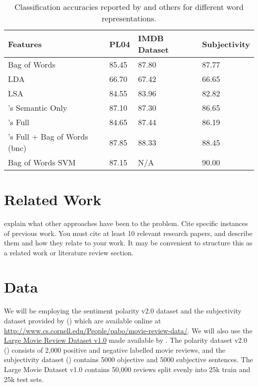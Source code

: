 \documentclass[11pt, oneside]{article}
\begin{document}
\begin{table}[H]
\begin{tabular}{ | l | p{1.5cm} | p{2.5cm} | p{2.5cm} |  }
 \hline
 \textbf{Features} & \textbf{PL04} & \textbf{IMDB Dataset} & \textbf{Subjectivity} \\
 \hline
 Bag of Words   & 85.45 & 87.80 & 87.77 \\
 LDA & 66.70 & 67.42 & 66.65 \\
 LSA & 84.55 & 83.96 & 82.82 \\
 \cite{maas2011learning}'s Semantic Only & 87.10 & 87.30 & 86.65 \\
 \cite{maas2011learning}'s Full & 84.65 & 87.44 & 86.19 \\
 \cite{maas2011learning}'s Full + Bag of Words (bnc) & 87.85 & 88.33 & 88.45 \\
 Bag of Words SVM \cite{pang2004sentimental} & 87.15 & N/A & 90.00 \\
 \hline
\end{tabular}
\caption{Classification accuracies reported by \cite{maas2011learning} and others for different word representations.}
\label{table:1}
\end{table}
\section{Related Work}
explain what other approaches have been to the problem. Cite specific instances of previous work. You must cite at least 10 relevant research papers, and describe them and how they relate to your work. It may be convenient to structure this as a related work or literature review section.
\section{Data}
\paragraph{}
We will be employing the sentiment polarity v2.0 dataset and the subjectivity dataset provided by (\cite{pang2004sentimental}) which are available online at \url{http://www.cs.cornell.edu/People/pabo/movie-review-data/}. We will also use the \href{http://ai.stanford.edu/~amaas/data/sentiment/}{Large Movie Review Dataset v1.0} made available by \cite{maas2011learning}. The polarity dataset v2.0 (\cite{pang2004sentimental}) consists of 2,000 positive and negative labelled movie reviews, and the subjectivity dataset (\cite{pang2004sentimental}) contains 5000 objective and 5000 subjective sentences. The Large Movie Dataset v1.0 \cite{maas2011learning}contains 50,000 reviews split evenly into 25k train and 25k test sets. 
\end{document}
